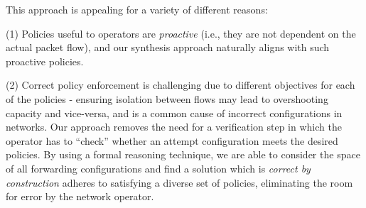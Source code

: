 This approach is appealing for a variety of different reasons: 

(1)
Policies useful to operators are \emph{proactive} (i.e., they are not
dependent on the actual packet flow), and our synthesis approach
naturally aligns with such proactive policies.


(2) Correct policy enforcement is challenging due to different
objectives for each of the policies - ensuring isolation between flows
may lead to overshooting capacity and vice-versa, and is a common
cause of incorrect configurations in networks. 
Our approach removes the need for a verification step in which the operator
has to ``check'' whether an attempt configuration meets the desired policies.
By using a formal
reasoning technique, we are able to consider the space of all
forwarding configurations and find a solution which 
is \emph{correct by construction}
adheres to
satisfying a diverse set of policies, eliminating the room for error
by the network operator. 

